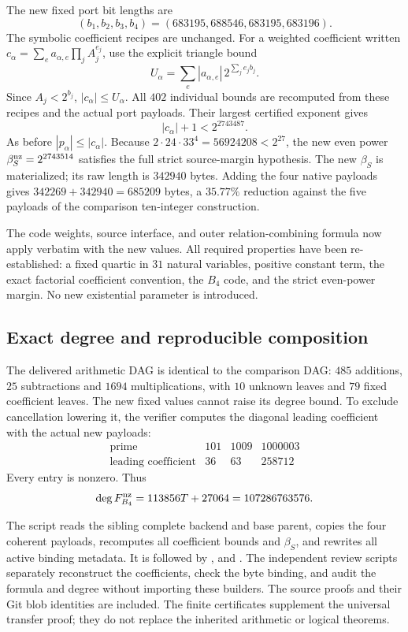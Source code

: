 The new fixed port bit lengths are
\[
 (b_1,b_2,b_3,b_4)=(683195,688546,683195,683196).
\]
The symbolic coefficient recipes are unchanged.  For a weighted
coefficient written
$c_\alpha=\sum_e a_{\alpha,e}\prod_j A_j^{e_j}$, use the explicit
triangle bound
\[
 U_\alpha=\sum_e |a_{\alpha,e}|\,
                  2^{\sum_j e_jb_j}.
\]
Since $A_j<2^{b_j}$, $|c_\alpha|\le U_\alpha$.  All $402$ individual
bounds are recomputed from these recipes and the actual port
payloads.  Their largest certified exponent gives
\[
 |c_\alpha|+1<2^{2743487}.
\]
As before $|p_\alpha|\le|c_\alpha|$.  Because
$2\cdot24\cdot33^4=56924208<2^{27}$, the new even power
$\beta_S^{\rm nz}=2^{2743514}$ satisfies the full strict
source-margin hypothesis.  The new $\beta_S$ is materialized;
its raw length is $342940$ bytes.  Adding the four native payloads
gives $342269+342940=685209$ bytes, a $35.77\%$ reduction against
the five payloads of the comparison ten-integer construction.

The code weights, source interface, and outer relation-combining
formula now apply verbatim with the new values.  All required
properties have been re-established: a fixed quartic in $31$
natural variables, positive constant term, the exact factorial
coefficient convention, the $B_4$ code, and the strict even-power
margin.  No new existential parameter is introduced.

\subsection{Exact degree and reproducible composition}

The delivered arithmetic DAG is identical to the comparison DAG:
$485$ additions, $25$ subtractions and $1694$ multiplications,
with $10$ unknown leaves and $79$ fixed coefficient leaves.
The new fixed values cannot raise its degree bound.  To exclude
cancellation lowering it, the verifier computes the diagonal
leading coefficient with the actual new payloads:
\[
 \begin{array}{c|rrr}
 \text{prime}&101&1009&1000003\\ \hline
 \text{leading coefficient}&36&63&258712
 \end{array}
\]
Every entry is nonzero.  Thus
\[
 \deg F^{\rm nz}_{B_4}=113856T+27064=107286763576.
\]

The script  reads the sibling complete
backend and base parent, copies the four coherent payloads,
recomputes all coefficient bounds and $\beta_S$, and rewrites
all active binding metadata.  It is followed by
,  and
.  The independent review scripts
separately reconstruct the coefficients, check the byte binding,
and audit the formula and degree without importing these builders.
The source proofs and their Git blob identities are included.
The finite certificates supplement the universal transfer proof;
they do not replace the inherited arithmetic or logical theorems.
